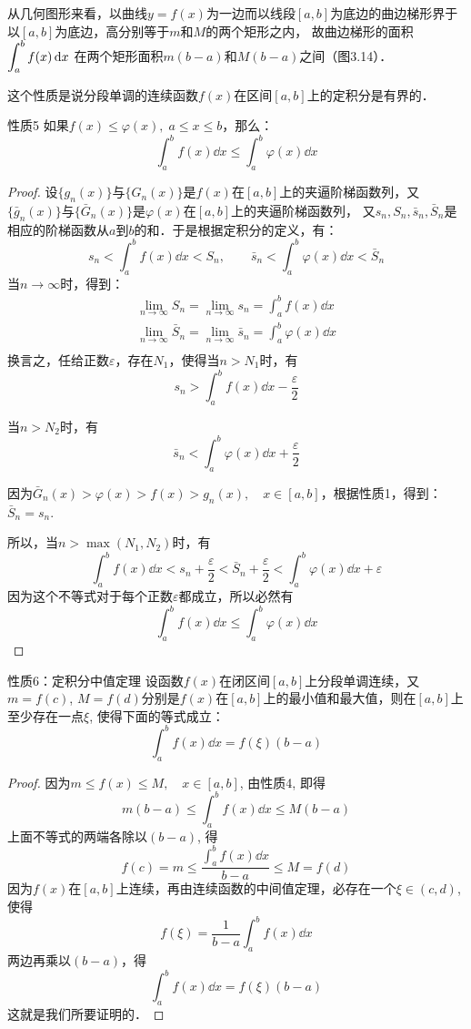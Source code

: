 从几何图形来看，以曲线$y=f(x)$为一边而以线段$[a,b]$为底边的曲边梯形界于以$[a,b]$为底边，高分别等于$m$和$M$的两个矩形之内，
故曲边梯形的面积$\displaystyle\int^b_a f(x)\,{\rm d} x$
在两个矩形面积$m(b-a)$和$M(b-a)$之间（图3.14）．

这个性质是说分段单调的连续函数$f(x)$在区间$[a,b]$上的定积分是有界的．

\begin{blk}{性质5}
如果$f(x)\le \varphi(x),\; a\le x\le b$，那么：
\[\int^b_a f(x)\dd x\le \int^b_a \varphi(x)\dd x\]
\end{blk}

\begin{proof}
    设$\{g_n(x)\}$与$\{G_n(x)\}$是$f(x)$在$[a,b]$上的夹逼阶梯函数列，又$\{\bar g_n(x)\}$与$\{\bar G_n(x)\}$是$\varphi(x)$在$[a,b]$上的夹逼阶梯函数列，
又$s_n, S_n, \bar s_n, \bar S_n$是相应的阶梯函数从$a$到$b$的和．于是根据定积分的定义，有：
\[s_n<\int^b_a f(x)\dd x<S_n,\qquad \bar s_n<\int^b_a \varphi(x)\dd x<\bar S_n\]
当$n\to\infty$时，得到：
\[\begin{split}
\lim_{n\to\infty}S_n =\lim_{n\to\infty}s_n =\int^b_a f(x)\dd x\\
\lim_{n\to\infty}\bar S_n =\lim_{n\to\infty}\bar s_n =\int^b_a \varphi(x)\dd x\\
\end{split}\]
换言之，任给正数$\varepsilon$，存在$N_1$，使得当$n>N_1$时，有
\[s_n>\int^b_a f(x)\dd x-\frac{\varepsilon}{2}\]

当$n>N_2$时，有
\[\bar s_n<\int^b_a \varphi(x)\dd x+\frac{\varepsilon}{2}\]

因为$\bar G_n(x)>\varphi(x)>f(x)>g_n(x),\quad x\in[a,b]$，根据性质1，得到：$\bar S_n=s_n$.

所以，当$n>\max(N_1,N_2)$时，有
\[\int^b_a f(x)\dd x<s_n+\frac{\varepsilon}{2}<\bar S_n+\frac{\varepsilon}{2}<\int^b_a \varphi(x)\dd x+\varepsilon\]
因为这个不等式对于每个正数$\varepsilon$都成立，所以必然有
\[\int^b_a f(x)\dd x\le \int^b_a \varphi(x)\dd x\]
\end{proof}

\begin{blk}{性质6：定积分中值定理}
   设函数$f(x)$在闭区间$[a,b]$上分段单调连续，又
$m=f(c)$, $M=f(d)$分别是$f(x)$在$[a,b]$上的最小值和最大值，则在$[a,b]$上至少存在一点$\xi$, 使得下面的等式成立：
\[\int^b_a f (x) \dd x=f(\xi) (b-a)\] 
\end{blk}

\begin{proof}
    因为$m\le f (x) \le M,\quad x\in [a,b]$, 
由性质4, 即得
\[m (b-a)\le \int^b_a f (x) \dd x\le M(b-a)\]
上面不等式的两端各除以$(b-a)$, 得
\[f(c)=m\le \frac{\int^b_a f (x) \dd x}{b-a}\le M=f(d)\]
因为$f(x)$在$[a,b]$上连续，再由连续函数的中间值定理，必存在一个$\xi\in(c,d)$, 使得
\[f(\xi)=\frac{1}{b-a}\int^b_a f (x) \dd x\]
两边再乘以$(b-a)$，得
\[\int^b_a f (x) \dd x=f(\xi)(b-a)\]
这就是我们所要证明的．
\end{proof}

